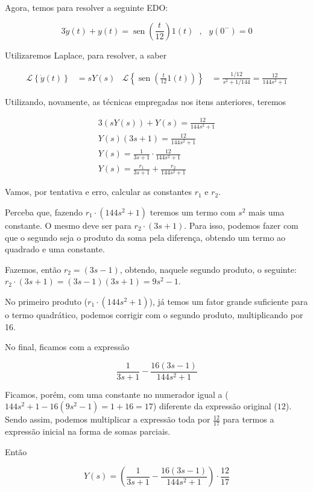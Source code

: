 \documentclass{article}
\DeclareMathOperator{\sen}{sen}
\begin{document}
Agora, temos para resolver a seguinte EDO:

\[ 3\dot{y}(t) + y(t) = \sen\left(\frac{t}{12}\right)1(t) \,\,\,\,,\,\,\,\, y(0^-) = 0\]

Utilizaremos Laplace, para resolver, a saber

\begin{align*}
    \mathcal{L}\left\{\dot{y}(t)\right\} &= sY(s) & \mathcal{L}\left\{\sen \left(\frac{t}{12}1(t)\right) \right\} &= \frac{1/12}{s^2 + 1 / 144} = \frac{12}{144s^2 + 1}
\end{align*}

Utilizando, novamente, as técnicas empregadas nos itens anteriores, teremos

\begin{align*}
    3(sY(s)) + Y(s) = \frac{12}{144s^2 + 1}\\
    Y(s)(3s + 1) = \frac{12}{144s^2 + 1}\\
    Y(s) = \frac{1}{3s + 1} \cdot \frac{12}{144s^2 + 1}\\
    Y(s) = \frac{r_1}{3s + 1} + \frac{r_2}{144s^2 + 1}
\end{align*}

Vamos, por tentativa e erro, calcular as constantes $r_1 \text{ e } r_2$.

Perceba que, fazendo $r_1 \cdot (144s^2 + 1)$ teremos um termo com $s^2$ mais uma constante. O mesmo deve ser para $r_2 \cdot (3s + 1)$. Para isso, podemos fazer com que o segundo seja o produto da soma pela diferença, obtendo um termo ao quadrado e uma constante.

Fazemos, então $r_2 = (3s - 1)$, obtendo, naquele segundo produto, o seguinte: $r_2 \cdot (3s + 1) = (3s - 1) (3s + 1) = 9s^2 - 1$.

No primeiro produto ($r_1 \cdot (144s^2 + 1)$), já temos um fator grande suficiente para o termo quadrático, podemos corrigir com o segundo produto, multiplicando por 16.

No final, ficamos com a expressão

\[\frac{1}{3s + 1} - \frac{16(3s - 1)}{144s^2 + 1}\]

Ficamos, porém, com uma constante no numerador igual a ($144s^2 + 1 - 16(9s^2 - 1) = 1 + 16 = 17$) diferente da expressão original ($12$). Sendo assim, podemos multiplicar a expressão toda por $\frac{12}{17}$ para termos a expressão inicial na forma de somas parciais.

Então

\[Y(s) = \left(\frac{1}{3s + 1} - \frac{16(3s - 1)}{144s^2 + 1}\right) \cdot \frac{12}{17}\]
\end{document}
